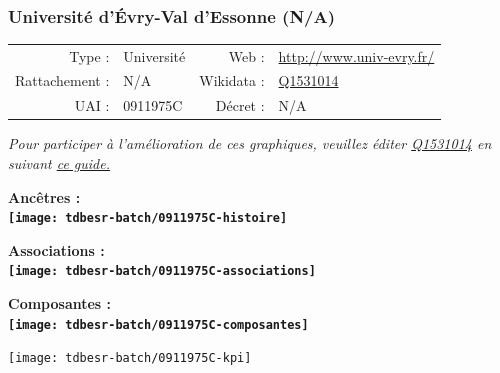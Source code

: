\documentclass[12pt,french,]{article}
\begin{document}
\ifoddpage \fi ~\newpage  

\hypertarget{universituxe9-duxe9vry-val-dessonne-na}{%
\subsubsection{Université d'Évry-Val d'Essonne
(N/A)}\label{universituxe9-duxe9vry-val-dessonne-na}}

\begin{tabular*}{\textwidth}{rp{5cm}rl}  
\hline  
Type : & Université & Web : &\href{http://www.univ-evry.fr/}{http://www.univ-evry.fr/} \\  
Rattachement : & N/A & Wikidata : & \href{https://www.wikidata.org/entity/Q1531014}{Q1531014} \\  
UAI : & 0911975C & Décret : & N/A \\  
\hline  
\end{tabular*}

\textit{\scriptsize Pour participer à l'amélioration de ces graphiques, veuillez éditer  \href{https://www.wikidata.org/entity/Q1531014}{Q1531014}  en suivant \href{https://github.com/cpesr/wikidataESR/blob/master/Rmd/wikidataESR.md}{ce guide.}}

\vspace{1cm}  
\begin{minipage}[b]{0.50\textwidth}\begin{center} \bf Ancêtres : \\  
\texttt{[image: tdbesr-batch/0911975C-histoire]} \end{center}\end{minipage}\begin{minipage}[b]{0.50\textwidth}\begin{center} \bf Associations : \\  
\texttt{[image: tdbesr-batch/0911975C-associations]} \end{center}\end{minipage}

\hrulefill

\begin{center} \bf Composantes : \\  
\texttt{[image: tdbesr-batch/0911975C-composantes]} \end{center}

\begin{center}\texttt{[image: tdbesr-batch/0911975C-kpi]} \end{center}\checkoddpage

\ifoddpage \fi ~\newpage  
\end{document}
